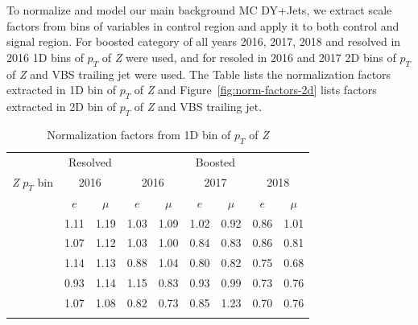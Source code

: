 To normalize and model our main background \gls{MC} DY+Jets,
we extract scale factors from bins of variables
in control region and apply it to both control and signal region.
For boosted category of all years 2016, 2017, 2018
and resolved in 2016 1D bins of \( p_T \) of \textit{Z} were used, and
for resoled in 2016 and 2017 2D bins of \( p_T \) of \textit{Z} and VBS trailing
jet were used. The Table lists the normalization
factors extracted in 1D bin of \( p_T \) of \textit{Z} and
Figure~\ref{fig:norm-factors-2d} lists factors extracted
in 2D bin of \( p_T \) of \textit{Z} and VBS trailing jet.

\begin{table}
  \caption{Normalization factors from 1D bin of \( p_T \) of \textit{Z}}
  \centering
  \begin{tabular}{lcccccccc}
    \toprule
                           & \multicolumn{2}{c}{Resolved} & \multicolumn{6}{c}{Boosted}                                                                                                   \\
    \cmidrule(lr){2-9}
    \textit{Z} \(p_T\) bin & \multicolumn{2}{c}{2016}     & \multicolumn{2}{c}{2016}    & \multicolumn{2}{c}{2017} & \multicolumn{2}{c}{2018}                                             \\
    \midrule
                           & \( e \)                      & \( \mu \)                   & \( e \)                  & \( \mu \)                & \( e \) & \( \mu \) & \( e \) & \( \mu \) \\
    \cmidrule(lr){2-9}\relax
    [0, 80]                & 1.11                         & 1.19                        & 1.03                     & 1.09                     & 1.02    & 0.92      & 0.86    & 1.01      \\\relax
    [80, 160]              & 1.07                         & 1.12                        & 1.03                     & 1.00                     & 0.84    & 0.83      & 0.86    & 0.81      \\\relax
    [160, 240]             & 1.14                         & 1.13                        & 0.88                     & 1.04                     & 0.80    & 0.82      & 0.75    & 0.68      \\\relax
    [240, 320]             & 0.93                         & 1.14                        & 1.15                     & 0.83                     & 0.93    & 0.99      & 0.73    & 0.76      \\\relax
    [320, 400]             & 1.07                         & 1.08                        & 0.82                     & 0.73                     & 0.85    & 1.23      & 0.70    & 0.76      \\\relax

\end{tabular}
\end{table}
